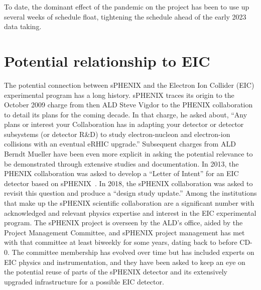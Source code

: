 To date, the dominant effect of the pandemic on the project has been
to use up several weeks of schedule float, tightening the schedule
ahead of the early 2023 data taking.

\section{Potential relationship to EIC}
\label{sec:eic}

The potential connection between sPHENIX and the Electron Ion Collider (EIC) experimental
program has a long history.  sPHENIX traces its origin to the October
2009 charge from then ALD Steve Vigdor to the PHENIX collaboration to
detail its plans for the coming decade.  In that charge, he asked
about, ``Any plans or interest your Collaboration has in adapting your
detector or detector subsystems (or detector R\&D) to study
electron-nucleon and electron-ion collisions with an eventual eRHIC
upgrade.''  Subsequent charges from ALD Berndt Mueller have been even
more explicit in asking the potential relevance to be demonstrated
through extensive studies and documentation.  In 2013, the PHENIX
collaboration was asked to develop a ``Letter of Intent'' for an EIC
detector based on sPHENIX~\cite{Adare:2014aaa}.  In 2018, the sPHENIX collaboration was
asked to revisit this question and produce a ``design study update.''
Among the institutions that make up the sPHENIX scientific
collaboration are a significant number with acknowledged and relevant
physics expertise and interest in the EIC experimental program.  The
sPHENIX project is overseen by the ALD's office, aided by the Project
Management Committee, and sPHENIX project management has met with that
committee at least biweekly for some years, dating back to before
CD-0.  The committee membership has evolved over time but has included
experts on EIC physics and instrumentation, and they have been asked
to keep an eye on the potential reuse of parts of the sPHENIX detector
and its extensively upgraded infrastructure for a possible EIC
detector.

